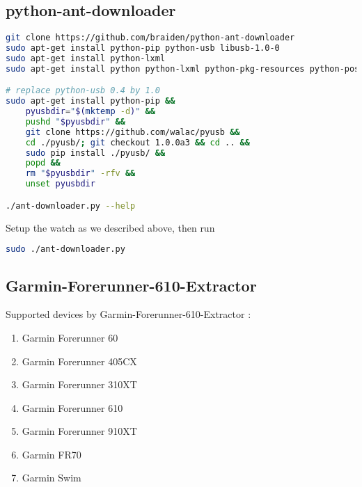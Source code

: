 \documentclass[letter,12pt,onecolumn]{article}
\newcommand{\cnt}[3]{{#1}{#2}{#3}}
\renewcommand{\cnt}[3]{#2}
\renewcommand{\cnt}[3]{#3}
\renewcommand{\cnt}[3]{#1}
\begin{document}
\subsection{\cnt{python-ant-downloader}{使用 {python-ant-downloader}}{使用 {python-ant-downloader}}}


\begin{lstlisting}[language=bash]
git clone https://github.com/braiden/python-ant-downloader
sudo apt-get install python-pip python-usb libusb-1.0-0
sudo apt-get install python-lxml
sudo apt-get install python python-lxml python-pkg-resources python-poster python-serial

# replace python-usb 0.4 by 1.0
sudo apt-get install python-pip &&
    pyusbdir="$(mktemp -d)" &&
    pushd "$pyusbdir" &&
    git clone https://github.com/walac/pyusb &&
    cd ./pyusb/; git checkout 1.0.0a3 && cd .. &&
    sudo pip install ./pyusb/ &&
    popd &&
    rm "$pyusbdir" -rfv &&
    unset pyusbdir

./ant-downloader.py --help
\end{lstlisting}

\cnt{Setup the watch as we described above, then run}{象前面说明的那样设置手表端，然后运行}{象前面說明的那樣設置手錶端，然後運行}
\begin{lstlisting}[language=bash]
sudo ./ant-downloader.py
\end{lstlisting}



\subsection{\cnt{Garmin-Forerunner-610-Extractor}{使用 {Garmin-Forerunner-610-Extractor}}{使用 {Garmin-Forerunner-610-Extractor}}}
\cnt{Supported devices by Garmin-Forerunner-610-Extractor \cite{gant610}:}{Garmin-Forerunner-610-Extractor \cite{gant610}所支持的设备：}{Garmin-Forerunner-610-Extractor \cite{gant610}所支持的設備：}
\begin{enumerate}
  \item Garmin Forerunner 60
  \item Garmin Forerunner 405CX
  \item Garmin Forerunner 310XT
  \item Garmin Forerunner 610
  \item Garmin Forerunner 910XT
  \item Garmin FR70
  \item Garmin Swim
\end{enumerate}
\end{document}
